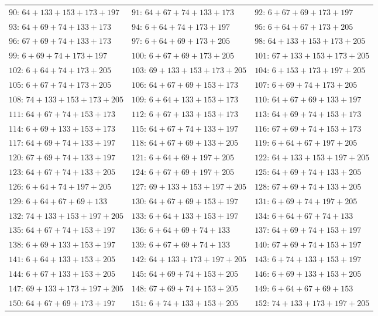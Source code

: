 \begin{center}\scriptsize
\begin{tabular}{lll}
$90$: $64+133+153+173+197$ & $91$: $64+67+74+133+173$ & $92$: $6+67+69+173+197$\\
$93$: $64+69+74+133+173$ & $94$: $6+64+74+173+197$ & $95$: $6+64+67+173+205$\\
$96$: $67+69+74+133+173$ & $97$: $6+64+69+173+205$ & $98$: $64+133+153+173+205$\\
$99$: $6+69+74+173+197$ & $100$: $6+67+69+173+205$ & $101$: $67+133+153+173+205$\\
$102$: $6+64+74+173+205$ & $103$: $69+133+153+173+205$ & $104$: $6+153+173+197+205$\\
$105$: $6+67+74+173+205$ & $106$: $64+67+69+153+173$ & $107$: $6+69+74+173+205$\\
$108$: $74+133+153+173+205$ & $109$: $6+64+133+153+173$ & $110$: $64+67+69+133+197$\\
$111$: $64+67+74+153+173$ & $112$: $6+67+133+153+173$ & $113$: $64+69+74+153+173$\\
$114$: $6+69+133+153+173$ & $115$: $64+67+74+133+197$ & $116$: $67+69+74+153+173$\\
$117$: $64+69+74+133+197$ & $118$: $64+67+69+133+205$ & $119$: $6+64+67+197+205$\\
$120$: $67+69+74+133+197$ & $121$: $6+64+69+197+205$ & $122$: $64+133+153+197+205$\\
$123$: $64+67+74+133+205$ & $124$: $6+67+69+197+205$ & $125$: $64+69+74+133+205$\\
$126$: $6+64+74+197+205$ & $127$: $69+133+153+197+205$ & $128$: $67+69+74+133+205$\\
$129$: $6+64+67+69+133$ & $130$: $64+67+69+153+197$ & $131$: $6+69+74+197+205$\\
$132$: $74+133+153+197+205$ & $133$: $6+64+133+153+197$ & $134$: $6+64+67+74+133$\\
$135$: $64+67+74+153+197$ & $136$: $6+64+69+74+133$ & $137$: $64+69+74+153+197$\\
$138$: $6+69+133+153+197$ & $139$: $6+67+69+74+133$ & $140$: $67+69+74+153+197$\\
$141$: $6+64+133+153+205$ & $142$: $64+133+173+197+205$ & $143$: $6+74+133+153+197$\\
$144$: $6+67+133+153+205$ & $145$: $64+69+74+153+205$ & $146$: $6+69+133+153+205$\\
$147$: $69+133+173+197+205$ & $148$: $67+69+74+153+205$ & $149$: $6+64+67+69+153$\\
$150$: $64+67+69+173+197$ & $151$: $6+74+133+153+205$ & $152$: $74+133+173+197+205$\\

\end{tabular}
\end{center}
